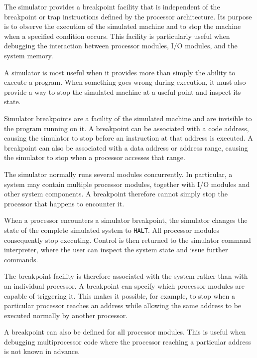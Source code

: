 
The simulator provides a breakpoint facility that is independent of the breakpoint or trap instructions defined by the processor architecture. Its purpose is to observe the execution of the simulated machine and to stop the machine when a specified condition occurs. This facility is particularly useful when debugging the interaction between processor modules, I/O modules, and the system memory.


A simulator is most useful when it provides more than simply the ability to execute a program. When something goes wrong during execution, it must also provide a way to stop the simulated machine at a useful point and inspect its state.

Simulator breakpoints are a facility of the simulated machine and are invisible to the program running on it. A breakpoint can be associated with a code address, causing the simulator to stop before an instruction at that address is executed. A breakpoint can also be associated with a data address or address range, causing the simulator to stop when a processor accesses that range.


The simulator normally runs several modules concurrently. In particular, a system may contain multiple processor modules, together with I/O modules and other system components. A breakpoint therefore cannot simply stop the processor that happens to encounter it.

When a processor encounters a simulator breakpoint, the simulator changes the state of the complete simulated system to \texttt{HALT}. All processor modules consequently stop executing. Control is then returned to the simulator command interpreter, where the user can inspect the system state and issue further commands.

The breakpoint facility is therefore associated with the system rather than with an individual processor. A breakpoint can specify which processor modules are capable of triggering it. This makes it possible, for example, to stop when a particular processor reaches an address while allowing the same address to be executed normally by another processor.

A breakpoint can also be defined for all processor modules. This is useful when debugging multiprocessor code where the processor reaching a particular address is not known in advance.


